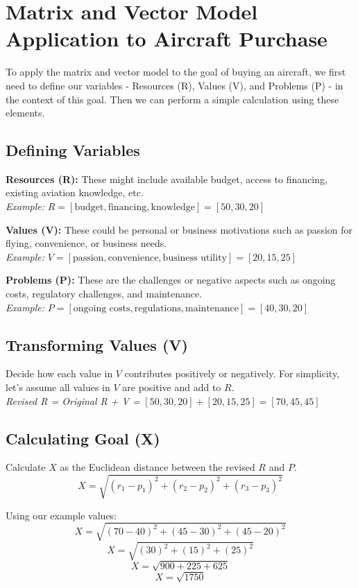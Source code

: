 \documentclass{article}
\begin{document}
\section*{Matrix and Vector Model Application to Aircraft Purchase}

To apply the matrix and vector model to the goal of buying an aircraft, we first need to define our variables - Resources (R), Values (V), and Problems (P) - in the context of this goal. Then we can perform a simple calculation using these elements.

\subsection*{Defining Variables}
\textbf{Resources (R):} These might include available budget, access to financing, existing aviation knowledge, etc.\\
\textit{Example:} \( R = [\text{budget}, \text{financing}, \text{knowledge}] = [50, 30, 20] \)

\textbf{Values (V):} These could be personal or business motivations such as passion for flying, convenience, or business needs.\\
\textit{Example:} \( V = [\text{passion}, \text{convenience}, \text{business utility}] = [20, 15, 25] \)

\textbf{Problems (P):} These are the challenges or negative aspects such as ongoing costs, regulatory challenges, and maintenance.\\
\textit{Example:} \( P = [\text{ongoing costs}, \text{regulations}, \text{maintenance}] = [40, 30, 20] \)

\subsection*{Transforming Values (V)}
Decide how each value in \( V \) contributes positively or negatively. For simplicity, let's assume all values in \( V \) are positive and add to \( R \).\\
\textit{Revised R = Original R + V =} \( [50, 30, 20] + [20, 15, 25] = [70, 45, 45] \)

\subsection*{Calculating Goal (X)}
Calculate \( X \) as the Euclidean distance between the revised \( R \) and \( P \).
\[ X = \sqrt{(r_1 - p_1)^2 + (r_2 - p_2)^2 + (r_3 - p_3)^2} \]

Using our example values:
\[ X = \sqrt{(70 - 40)^2 + (45 - 30)^2 + (45 - 20)^2} \]
\[ X = \sqrt{(30)^2 + (15)^2 + (25)^2} \]
\[ X = \sqrt{900 + 225 + 625} \]
\[ X = \sqrt{1750} \]
\end{document}
